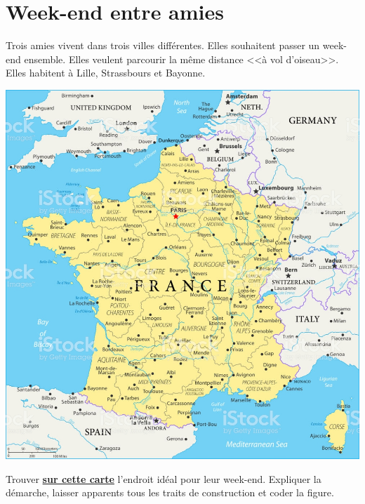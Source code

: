 \section{Week-end entre amies}

Trois amies vivent dans trois villes différentes. Elles souhaitent passer un week-end ensemble. Elles veulent parcourir la même distance <<à vol d'oiseau>>. Elles habitent à Lille, Strassbours et Bayonne.

\begin{center}
	\includegraphics[scale=1.55]{img/france}
\end{center}

\begin{questions}
	\question Trouver \textbf{\underline{sur cette carte}} l'endroit idéal pour leur week-end. Expliquer la démarche, laisser apparents tous les traits de construction et coder la figure.
\end{questions}

